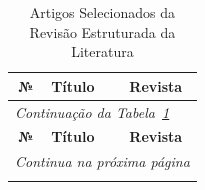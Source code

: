 \begin{longtable}{|c|p{11.5cm}|c|}
    \caption{Artigos Selecionados da Revisão Estruturada da Literatura}
    \label{tab-artigos-slr} \\
    \hline
    \textbf{№} & \textbf{Título} & \textbf{Revista} \\
    \hline
    \endfirsthead

    \multicolumn{3}{l}{\small\textit{Continuação da Tabela~\ref{tab-artigos-slr}}} \\
    \hline
    \textbf{№} & \textbf{Título} & \textbf{Revista} \\
    \hline
    \endhead

    \hline
    \multicolumn{3}{r}{\small\textit{Continua na próxima página}} \\
    \endfoot

    \hline
    \endlastfoot


\end{longtable}
